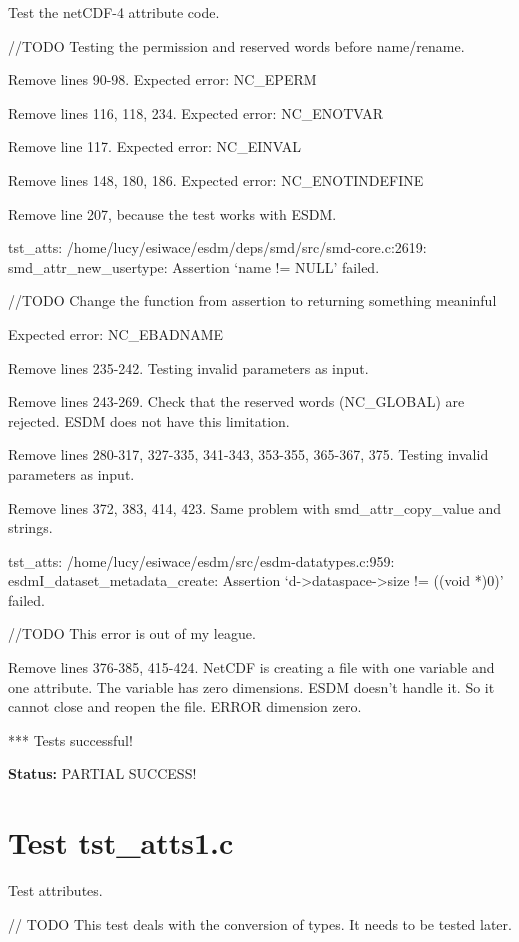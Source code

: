 Test the netCDF-4 attribute code.

//TODO Testing the permission and reserved words before name/rename.

Remove lines 90-98. Expected error: NC\_EPERM

Remove lines 116, 118, 234. Expected error: NC\_ENOTVAR

Remove line 117. Expected error: NC\_EINVAL

Remove lines 148, 180, 186. Expected error: NC\_ENOTINDEFINE

Remove line 207, because the test works with ESDM.

tst\_atts: /home/lucy/esiwace/esdm/deps/smd/src/smd-core.c:2619: smd\_attr\_new\_usertype: Assertion `name != NULL' failed.

//TODO Change the function from assertion to returning something meaninful

Expected error: NC\_EBADNAME

Remove lines 235-242. Testing invalid parameters as input.

Remove lines 243-269. Check that the reserved words (NC\_GLOBAL) are rejected. ESDM does not have this limitation.

Remove lines 280-317, 327-335, 341-343, 353-355, 365-367, 375. Testing invalid parameters as input.

Remove lines 372, 383, 414, 423. Same problem with smd\_attr\_copy\_value and strings.

tst\_atts: /home/lucy/esiwace/esdm/src/esdm-datatypes.c:959: esdmI\_dataset\_metadata\_create: Assertion `d->dataspace->size != ((void *)0)' failed.

//TODO This error is out of my league.

Remove lines 376-385, 415-424. NetCDF is creating a file with one variable and one attribute. The variable has zero dimensions. ESDM doesn't handle it. So it cannot close and reopen the file. ERROR dimension zero.

*** Tests successful!

{\bf \large Status: } PARTIAL SUCCESS!

\section{Test tst\_atts1.c}

Test attributes.

// TODO This test deals with the conversion of types. It needs to be tested later.

